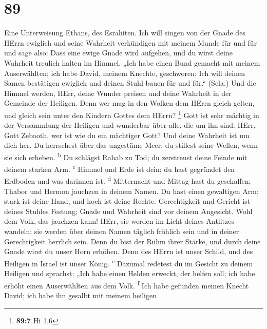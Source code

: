 \hypertarget{section-88}{%
\section{89}\label{section-88}}

 Eine Unterweisung Ethans, des Esrahiten. 
Ich will singen von der Gnade des HErrn ewiglich und seine Wahrheit
verkündigen mit meinem Munde für und für  und sage also:
Dass eine ewige Gnade wird aufgehen, und du wirst deine Wahrheit
treulich halten im Himmel.  „Ich habe einen Bund gemacht
mit meinem Auserwählten; ich habe David, meinem Knechte, geschworen:
 Ich will deinen Samen bestätigen ewiglich und deinen
Stuhl bauen für und für.`` (Sela.)  Und die Himmel werden,
HErr, deine Wunder preisen und deine Wahrheit in der Gemeinde der
Heiligen.  Denn wer mag in den Wolken dem HErrn gleich
gelten, und gleich sein unter den Kindern Gottes dem HErrn? \footnote{\textbf{89:7}
  Hi 1,6}  Gott ist sehr mächtig in der Versammlung der
Heiligen und wunderbar über alle, die um ihn sind.  HErr,
Gott Zebaoth, wer ist wie du ein mächtiger Gott? Und deine Wahrheit ist
um dich her.  Du herrschest über das ungestüme Meer; du
stillest seine Wellen, wenn sie sich erheben. \textsuperscript{b}
 Du schlägst Rahab zu Tod; du zerstreust deine Feinde mit
deinem starken Arm. \textsuperscript{c}  Himmel und Erde
ist dein; du hast gegründet den Erdboden und was darinnen ist.
\textsuperscript{d}  Mitternacht und Mittag hast du
geschaffen; Thabor und Hermon jauchzen in deinem Namen. 
Du hast einen gewaltigen Arm; stark ist deine Hand, und hoch ist deine
Rechte.  Gerechtigkeit und Gericht ist deines Stuhles
Festung; Gnade und Wahrheit sind vor deinem Angesicht. 
Wohl dem Volk, das jauchzen kann! HErr, sie werden im Licht deines
Antlitzes wandeln;  sie werden über deinen Namen täglich
fröhlich sein und in deiner Gerechtigkeit herrlich sein. 
Denn du bist der Ruhm ihrer Stärke, und durch deine Gnade wirst du unser
Horn erhöhen.  Denn des HErrn ist unser Schild, und des
Heiligen in Israel ist unser König. \textsuperscript{e} 
Dazumal redetest du im Gesicht zu deinem Heiligen und sprachst: „Ich
habe einen Helden erweckt, der helfen soll; ich habe erhöht einen
Auserwählten aus dem Volk. \textsuperscript{f}  Ich habe
gefunden meinen Knecht David; ich habe ihn gesalbt mit meinem heiligen
